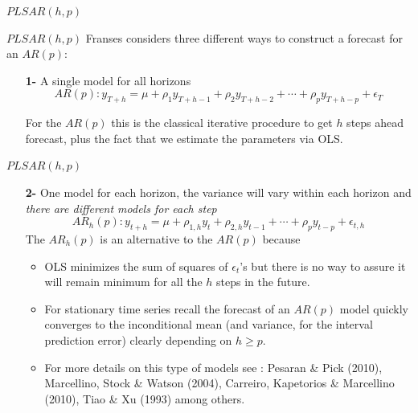 \documentclass{beamer}
\newcommand{\?}{?`}
\begin{document}
\begin{frame}{}
  \begin{block}{}
    \begin{center}
      \vspace{3mm}
      {\Large $PLSAR(h,p)$}
      \vspace{3mm}
    \end{center}
  \end{block}
\end{frame}

\begin{frame}{$PLSAR(h,p)$}
  Franses considers three different ways to construct a forecast for an $AR(p)$:
  \bigskip
  \begin{itemize}
    \item[\textbf{1-}] A single model for all horizons
      \begin{displaymath}
        AR(p): y_{T+h}=\mu+
        \rho_1y_{T+h-1}+\rho_2y_{T+h-2}+\cdots + \rho_py_{T+h-p} + \epsilon_T
      \end{displaymath}

      For the $AR(p)$ this is the classical iterative procedure to get $h$
      steps ahead forecast, plus the fact that we estimate the parameters via OLS.
  \end{itemize}
\end{frame}

\begin{frame}{$PLSAR(h,p)$}
  \begin{itemize}
  \item[\textbf{2-}] One model for each horizon, the variance will vary within each horizon and {\it{there are different models for each step}}
    \begin{displaymath}
      AR_h(p): y_{t+h}=\mu+
      \rho_{1,h}y_{t}+\rho_{2,h}y_{t-1}+\cdots + \rho_py_{t-p}+\epsilon_{t,h}
    \end{displaymath}
    The $AR_h(p)$  is an alternative to the $AR(p)$ because
    \begin{itemize}
    \item OLS minimizes the sum of squares of $\epsilon_t$'s  but there is no way to assure it will remain minimum for all the $h$ steps in the future.
    \item For stationary time series recall the forecast of an  $AR(p)$ model quickly converges to the inconditional mean
    (and variance, for the interval prediction error) clearly depending on
    $h\geq p$.
    \item For more details on this type of models see : Pesaran \& Pick (2010), Marcellino, Stock \& Watson (2004),
    Carreiro, Kapetorios \& Marcellino (2010), Tiao \& Xu (1993) among others.
    \end{itemize}
  \end{itemize}
\end{frame}
\end{document}
